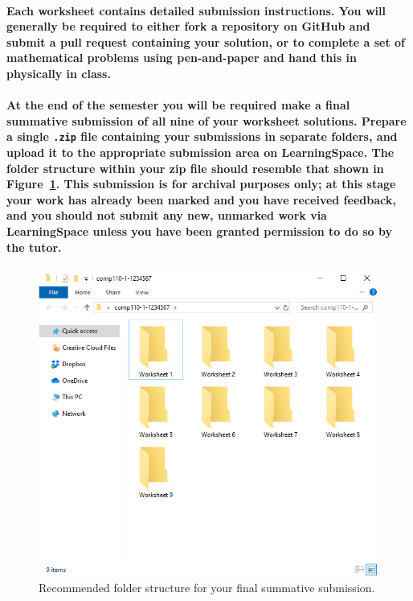 \documentclass{../../fal_assignment}
\begin{document}
\paragraph{Each worksheet contains detailed submission instructions. You will generally be required to either \textbf{fork} a repository on GitHub and submit a \textbf{pull request} containing your solution, or to complete a set of mathematical problems using pen-and-paper and hand this in physically in class.}

\paragraph{At the end of the semester you will be required make a final summative submission of all nine of your worksheet solutions.
Prepare a \textbf{single \texttt{.zip} file} containing your submissions \textbf{in separate folders}, and upload it to the appropriate submission area on LearningSpace. The folder structure within your zip file should resemble that shown in Figure~\ref{fig:folder_structure}.
This submission is for archival purposes only; at this stage your work has already been marked and you have received feedback, and you should \textbf{not} submit any new, unmarked work via LearningSpace unless you have been granted permission to do so by the tutor.}
\begin{figure}
    \begin{center}
        \includegraphics[height=0.4\textheight]{folder_structure}
    \end{center}
    \caption{Recommended folder structure for your final summative submission.}
    \label{fig:folder_structure}
\end{figure}
\end{document}
